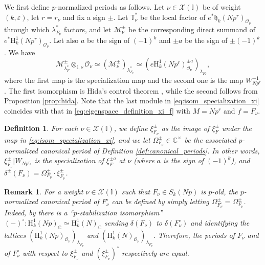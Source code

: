 \documentclass[12pt]{amsart}
\newcommand\bI{\mathbb{I}}
\newcommand\bC{\mathbb{C}}
\newcommand\bT{\mathbb{T}}
\newcommand\cM{\mathcal{M}}
\newcommand\cO{\mathcal{O}}
\newcommand\cX{\mathcal{X}}
\newcommand\gh{\mathfrak{h}}
\newcommand{\HH}{\mathrm{H}}
\theoremstyle{defstyle}
\newtheorem{definition}[subsubsection]{Definition}
\newtheorem{remark}[subsubsection]{Remark}
\theoremstyle{thmstyle}
\begin{document}
We first define $p$-normalized periods as follows. Let $\nu\in\cX(\bI)$ be of weight $(k,\varepsilon)$, let $r=r_\nu$ and fix a sign $\pm$. Let $\bT^*_\nu$ be the local factor of $e^*\gh_k(Np^r)_{\cO_\nu}$ through which $\lambda^*_{F_\nu}$ factors, and let $\cM^\pm_\nu$ be the corresponding direct summand of $e^*\HH^1_k(Np^r)_{\cO_\nu}$. 
Let also $a$ be the sign of $(-1)^k$ and $\pm a$ be the sign of $\pm (-1)^k$.
We have
\begin{equation}\label{eq:isom_specialization_xi}
	\cM^\pm_{\lambda^*_F} \otimes_{\bI,\nu} \cO_\nu \simeq (\cM^\pm_\nu)_{\lambda^*_{F_\nu}} \simeq (e\HH^1_k(Np^r)^{\pm a}_{\cO_\nu})_{\lambda_{F_\nu}},
\end{equation}
where the first map is the specialization map and the second one is the map $W_{Np^r}^{-1}$. The first isomorphism is Hida's control theorem \cite[Thm. 4.2]{hidaAIF}, while the second follows from Proposition \ref{prop:hida}. Note that the last module in \eqref{eq:isom_specialization_xi} coincides with that in \eqref{eq:eigenspace_definition_xi_f} with $M=Np^r$ and $f=F_\nu$.
\begin{definition}\label{def:family_canonical_periods}
	For each $\nu\in\cX(\bI)$, we define $\xi_{F_\nu}^\pm$ as the image of $\xi^\pm_F$ under the map in \eqref{eq:isom_specialization_xi}, and we let $\Omega^\pm_{F_\nu}\in\bC^\times$ be the associated $p$-normalized canonical period of Definition \ref{def:canonical_periods}. In other words, $\xi_{F_\nu}^{\pm}|W_{Np^{r_\nu}}$ is the specialization of $\xi_{F}^{\pm a}$ at $\nu$ (where $a$ is the sign of $(-1)^k$), and $\delta^\pm(F_\nu)=\Omega^\pm_{F_\nu}\cdot\xi_{F_\nu}^\pm$.
\end{definition}
\begin{remark}\label{rem:periods_associated_newforms}
	For a weight $\nu\in\cX(\bI)$ such that $F_\nu\in S_k(Np)$ is $p$-old, the $p$-normalized canonical period of $F_\nu^\circ$ can be defined by simply letting $\Omega^\pm_{F_\nu^\circ}=\Omega^\pm_{F_\nu}$. Indeed, by \cite[Prop. 7.3.1]{KLZcambridge} there is a ``$p$-stabilization isomorphism'' $(-)^\circ\colon\HH^1_k(Np)_\bC\simeq \HH^1_k(N)_\bC$ sending $\delta(F_\nu)$ to $\delta(F_\nu^\circ)$ and identifying the lattices $(\HH^1_k(Np)_{\cO_\nu})_{\lambda_{F_\nu}}$ and $(\HH^1_k(N)_{\cO_\nu})_{\lambda_{F_\nu^\circ}}$. Therefore, the periods of $F_\nu$ and of $F_\nu^\circ$ with respect to $\xi_{F_\nu}^\pm$ and $(\xi_{F_\nu}^\pm)^\circ$ respectively are equal.
\end{remark}
\end{document}
